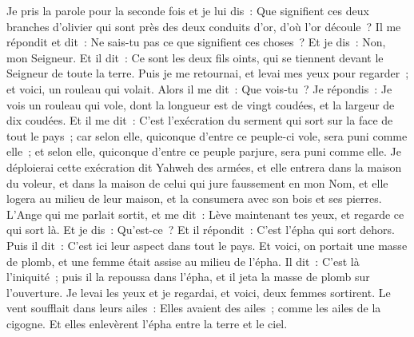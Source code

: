 \begin{multicols}{2}
Je pris la parole pour la seconde fois et je lui dis~: Que signifient ces deux branches d'olivier qui sont près des deux conduits d'or, d'où l'or découle~?
Il me répondit et dit~: Ne sais-tu pas ce que signifient ces choses~? Et je dis~: Non, mon Seigneur.
Et il dit~: Ce sont les deux fils oints, qui se tiennent devant le Seigneur de toute la terre.
\VerseOne{}Puis je me retournai, et levai mes yeux pour regarder~; et voici, un rouleau qui volait.
Alors il me dit~: Que vois-tu~? Je répondis~: Je vois un rouleau qui vole, dont la longueur est de vingt coudées, et la largeur de dix coudées.
Et il me dit~: C'est l'exécration du serment qui sort sur la face de tout le pays~; car selon elle, quiconque d'entre ce peuple-ci vole, sera puni comme elle~; et selon elle, quiconque d'entre ce peuple parjure, sera puni comme elle.
Je déploierai cette exécration dit Yahweh des armées, et elle entrera dans la maison du voleur, et dans la maison de celui qui jure faussement en mon Nom, et elle logera au milieu de leur maison, et la consumera avec son bois et ses pierres.
L'Ange qui me parlait sortit, et me dit~: Lève maintenant tes yeux, et regarde ce qui sort là.
Et je dis~: Qu'est-ce~? Et il répondit~: C'est l'épha qui sort dehors. Puis il dit~: C'est ici leur aspect dans tout le pays.
Et voici, on portait une masse de plomb, et une femme était assise au milieu de l'épha.
Il dit~: C'est là l'iniquité~; puis il la repoussa dans l'épha, et il jeta la masse de plomb sur l'ouverture.
Je levai les yeux et je regardai, et voici, deux femmes sortirent. Le vent soufflait dans leurs ailes~: Elles avaient des ailes~; comme les ailes de la cigogne. Et elles enlevèrent l'épha entre la terre et le ciel.

\end{multicols}
